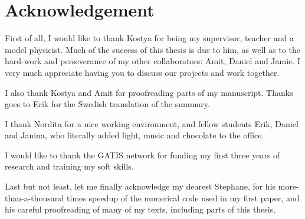 \chapter{Acknowledgement}


First of all, I would like to thank Kostya for being my supervisor, teacher and a model physicist. 
Much of the success of this thesis is due to him, as well as to the hard-work and perseverance of my other collaborators: Amit, Daniel and Jamie. I very much appreciate having you to discuss our projects and work together.

I also thank Kostya and Amit for proofreading parts of my manuscript. Thanks goes to Erik for the Swedish translation of the summary. 

I thank Nordita for a nice working environment, and fellow students Erik, Daniel and Janina, who literally added light, music and chocolate to the office.

I would like to thank the GATIS network for funding my first three years of research and training my soft skills.

Last but not least, let me finally acknowledge my dearest Stephane, for his more-than-a-thousand times speedup of the numerical code used in my first paper, and his careful proofreading of many of my texts, including parts of this thesis.